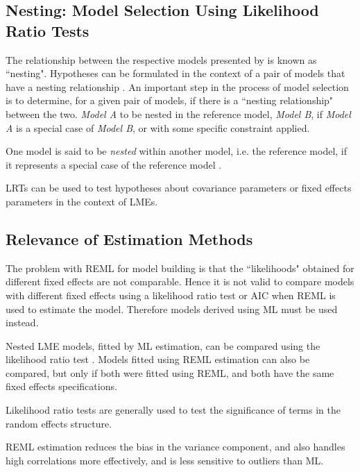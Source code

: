 \documentclass[12pt, a4paper]{report}
\theoremstyle{plain}
\theoremstyle{definition}
\theoremstyle{remark}
\begin{document}
	\subsection{Nesting: Model Selection Using Likelihood Ratio Tests}
	The relationship between the respective models presented by \citet{ARoy2009} is known as ``nesting".
	Hypotheses can be formulated in the context of a pair of models that have a nesting relationship \citet{west}.
	An important step in the process of model selection is to determine, for a given pair of models, if there is a ``nesting relationship" between the two.
	\textit{Model A} to be nested in the reference model, \textit{Model B}, if \textit{Model A} is a special case
	of \textit{Model B}, or with some specific constraint applied.
	
	One model is said to be \emph{nested} within another model, i.e. the reference model, if it represents a special case of the reference model \citep{PB}.
	
	
	
	
	LRTs can be used to test hypotheses about covariance parameters or fixed effects
	parameters in the context of LMEs.
	
	
	
	
	\subsection{Relevance of Estimation Methods}
	
	The problem with REML for model building is that the ``likelihoods" obtained for different fixed effects are not comparable. Hence it is not valid to compare models with different fixed effects using a likelihood ratio test or AIC when REML is used to estimate the model. Therefore models derived using ML must be used instead.
	
	
	
	Nested LME models, fitted by ML estimation, can be compared using the likelihood ratio test \citep{Lehmann2006}.
	Models fitted using REML estimation can also be compared, but only if both were fitted using REML, and both have the same fixed effects specifications.
	
	Likelihood ratio tests are generally used to test the significance of terms in the random effects structure.
	
	REML estimation reduces the bias in the variance component, and also handles high correlations more effectively, and is less sensitive to outliers than ML.  
	
\end{document}
